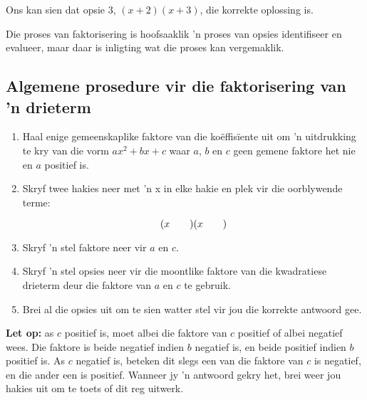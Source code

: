 \par
Ons kan sien dat opsie 3, $(x+2)(x+3)$, die korrekte oplossing is. \par
Die proses van faktorisering is hoofsaaklik ’n proses van opsies identifiseer en evalueer, maar daar is inligting wat die proses kan vergemaklik.\par 


\subsection*{Algemene prosedure vir die faktorisering van 'n drieterm}

\begin{enumerate}[itemsep=5pt, label=\textbf{\arabic*}. ] 
\item Haal enige gemeenskaplike faktore van die koëffisïente uit om ’n uitdrukking te kry van die vorm $a{x}^{2}+bx+c$ waar $a$, $b$ en $c$ geen gemene faktore het nie en $a$ positief is.
\item Skryf twee hakies neer met ’n x in elke hakie en plek vir die oorblywende terme:

\begin{equation*}
(x\phantom{\rule{2.em}{0ex}})(x\phantom{\rule{2.em}{0ex}})
\end{equation*}
\item Skryf ’n stel faktore neer vir $a$ en $c$.
\item Skryf ’n stel opsies neer vir die moontlike faktore van die kwadratiese drieterm deur die faktore van $a$ en $c$ te gebruik.
\item Brei al die opsies uit om te sien watter stel vir jou die korrekte antwoord gee.
\end{enumerate}
 \textbf{Let op:} as $c$ positief is, moet albei die faktore van $c$ positief of albei negatief wees. Die faktore is beide negatief indien $b$ negatief is, en beide positief indien $b$ positief is. As $c$ negatief is, beteken dit slegs een van die faktore van $c$ is negatief, en die ander een is positief. Wanneer jy ’n antwoord gekry het, brei weer jou hakies uit om te toets of dit reg uitwerk.
